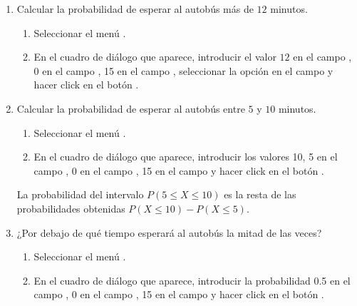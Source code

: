 \begin{enumerate}[leftmargin=*]
\begin{enumerate}
\item Calcular la probabilidad de esperar al autobús más de $12$ minutos.
\begin{indicacion}
\begin{enumerate}
\item Seleccionar el menú .
\item En el cuadro de diálogo que aparece, introducir el valor $12$ en el campo , 0 en el
campo , 15 en el campo , seleccionar la opción  en el campo  y hacer click en el
botón .
\end{enumerate}
\end{indicacion}

\item Calcular la probabilidad de esperar al autobús entre $5$ y $10$ minutos.
\begin{indicacion}
\begin{enumerate}
\item Seleccionar el menú .
\item En el cuadro de diálogo que aparece, introducir los valores 10, 5 en el campo , 0 en el campo
, 15 en el campo  y hacer click en el botón .
\end{enumerate}
La probabilidad del intervalo $P(5\leq X\leq 10)$ es la resta de las probabilidades obtenidas $P(X\leq 10)-P(X\leq 5)$.
\end{indicacion}

\item ¿Por debajo de qué tiempo esperará al autobús la mitad de las veces?
\begin{indicacion}
\begin{enumerate}
\item Seleccionar el menú .
\item En el cuadro de diálogo que aparece, introducir la probabilidad 0.5 en el campo ,
0 en el campo , 15 en el campo  y hacer click en el botón .
\end{enumerate}
\end{indicacion}


\end{enumerate}
\end{enumerate}
